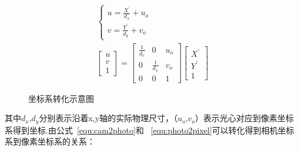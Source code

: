 \begin{equation}
  \begin{split}
    \left\{\begin{array}{l}{u=\frac{X^{\prime}}{d_{x}}+u_{o}} \\ {v=\frac{Y^{\prime}}{d_{y}}+v_{o}}\end{array}\right.\\
    \left[\begin{array}{l}{u} \\ {v} \\ {1}\end{array}\right]=\left[\begin{array}{ccc}{\frac{1}{d_{x}}} & {0} & {u_{o}} \\ {0} & {\frac{1}{d_{x}}} & {v_{o}} \\ {0} & {0} & {1}\end{array}\right]\left[\begin{array}{c}{X^{\prime}} \\ {Y^{\prime}} \\ {1}\end{array}\right]
  \end{split}
  \label{equ:photo2pixel}
\end{equation}
\begin{figure}[H]
  \centering%
  \hspace{6em}%
  \caption{坐标系转化示意图}
  \label{fig:trans}
\end{figure}
其中$d_x$,$d_y$分别表示沿着x,y轴的实际物理尺寸，（$u_o$,$v_o$）表示光心对应到像素坐标系得到坐标.由公式~\ref{equ:cam2photo}和
~\ref{equ:photo2pixel}可以转化得到相机坐标系到像素坐标系的关系：
